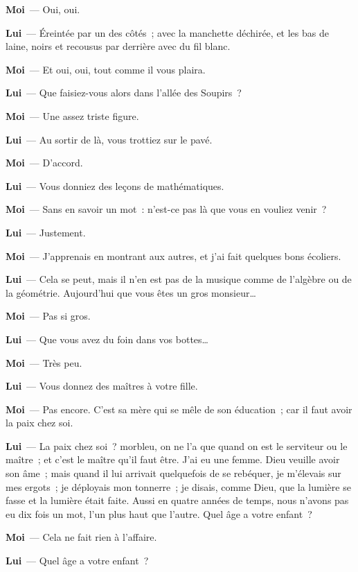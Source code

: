 \documentclass[french,twoside]{book} %
\newcommand{\labelchar}[1]{\textbf{\color{rubric} #1}}
\begin{document}
\labelchar{Moi} — Oui, oui.\par
\labelchar{Lui} — Éreintée par un des côtés ; avec la manchette déchirée, et les bas de laine, noirs et recousus par derrière avec du fil blanc.\par
\labelchar{Moi} — Et oui, oui, tout comme il vous plaira.\par
\labelchar{Lui} — Que faisiez-vous alors dans l’allée des Soupirs ?\par
\labelchar{Moi} — Une assez triste figure.\par
\labelchar{Lui} — Au sortir de là, vous trottiez sur le pavé.\par
\labelchar{Moi} — D’accord.\par
\labelchar{Lui} — Vous donniez des leçons de mathématiques.\par
\labelchar{Moi} — Sans en savoir un mot : n’est-ce pas là que vous en vouliez venir ?\par
\labelchar{Lui} — Justement.\par
\labelchar{Moi} — J’apprenais en montrant aux autres, et j’ai fait quelques bons écoliers.\par
\labelchar{Lui} — Cela se peut, mais il n’en est pas de la musique comme de l’algèbre ou de la géométrie. Aujourd’hui que vous êtes un gros monsieur…\par
\labelchar{Moi} — Pas si gros.\par
\labelchar{Lui} — Que vous avez du foin dans vos bottes…\par
\labelchar{Moi} — Très peu.\par
\labelchar{Lui} — Vous donnez des maîtres à votre fille.\par
\labelchar{Moi} — Pas encore. C’est sa mère qui se mêle de son éducation ; car il faut avoir la paix chez soi.\par
\labelchar{Lui} — La paix chez soi ? morbleu, on ne l’a que quand on est le serviteur ou le maître ; et c’est le maître qu’il faut être. J’ai eu une femme. Dieu veuille avoir son âme ; mais quand il lui arrivait quelquefois de se rebéquer, je m’élevais sur mes ergots ; je déployais mon tonnerre ; je disais, comme Dieu, que la lumière se fasse et la lumière était faite. Aussi en quatre années de temps, nous n’avons pas eu dix fois un mot, l’un plus haut que l’autre. Quel âge a votre enfant ?\par
\labelchar{Moi} — Cela ne fait rien à l’affaire.\par
\labelchar{Lui} — Quel âge a votre enfant ?\par
\end{document}
